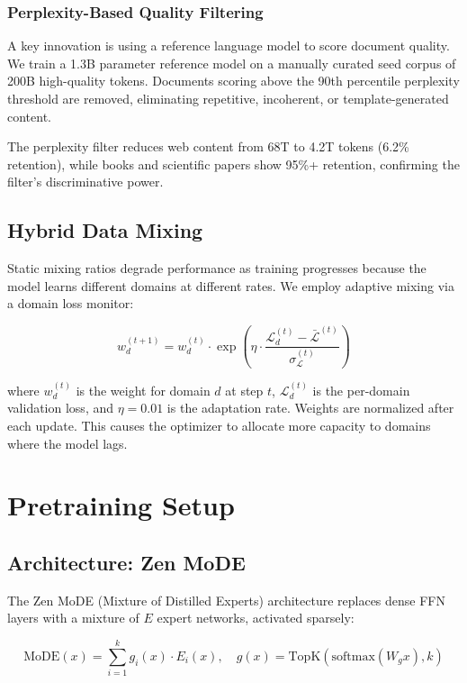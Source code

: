 \documentclass[11pt,a4paper]{article}
\begin{document}
\subsubsection{Perplexity-Based Quality Filtering}

A key innovation is using a reference language model to score document quality.
We train a 1.3B parameter reference model on a manually curated seed corpus of
200B high-quality tokens. Documents scoring above the 90th percentile perplexity
threshold are removed, eliminating repetitive, incoherent, or template-generated content.

The perplexity filter reduces web content from 68T to 4.2T tokens (6.2\% retention),
while books and scientific papers show 95\%+ retention, confirming the filter's
discriminative power.

\subsection{Hybrid Data Mixing}

Static mixing ratios degrade performance as training progresses because the model
learns different domains at different rates. We employ adaptive mixing via a
domain loss monitor:

\begin{equation}
w_d^{(t+1)} = w_d^{(t)} \cdot \exp\left(\eta \cdot \frac{\mathcal{L}_d^{(t)} - \bar{\mathcal{L}}^{(t)}}{\sigma_\mathcal{L}^{(t)}}\right)
\end{equation}

where $w_d^{(t)}$ is the weight for domain $d$ at step $t$, $\mathcal{L}_d^{(t)}$ is
the per-domain validation loss, and $\eta = 0.01$ is the adaptation rate. Weights
are normalized after each update. This causes the optimizer to allocate more capacity
to domains where the model lags.

\section{Pretraining Setup}

\subsection{Architecture: Zen MoDE}

The Zen MoDE (Mixture of Distilled Experts) architecture replaces dense FFN layers
with a mixture of $E$ expert networks, activated sparsely:

\begin{equation}
\text{MoDE}(x) = \sum_{i=1}^{k} g_i(x) \cdot E_i(x), \quad g(x) = \text{TopK}(\text{softmax}(W_g x), k)
\end{equation}
\end{document}
